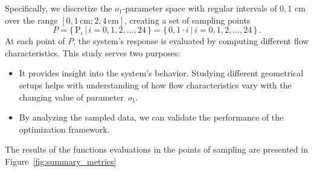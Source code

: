Specifically, we discretize the $o_1$-parameter space with regular intervals of $0{,}1$ cm over the range $[0{,}1 \, \mathrm{cm}; 2{,}4 \, \mathrm{cm}]$, creating a set of sampling points
\begin{equation}
	P = \Big\{ \, \text{P}_i \, \big| \, i=0,1,2, \dots, 24 \, \Big\} = \Big\{ \, 0{,}1 \cdot i \: \big| \, i=0,1,2, \dots, 24 \, \Big\} \, .
\end{equation}
At each point of $P$, the system's response is evaluated by computing different flow characteristics. This study serves two purposes:
\begin{itemize}
	\item It provides insight into the system's behavior. Studying different geometrical setups helps with understanding of how flow characteristics vary with the changing value of parameter~$o_1$.
	\item By analyzing the sampled data, we can validate the performance of the optimization framework.
\end{itemize}
The results of the functions evaluations in the points of sampling are presented in Figure~\ref{fig:summary_metrics}


